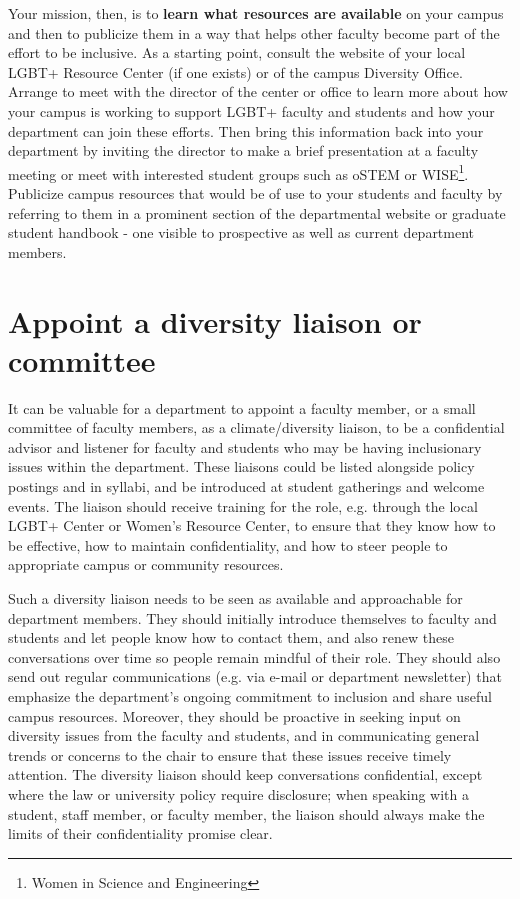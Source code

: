 Your mission, then, is to \textbf{learn what resources are available} on your campus and then to publicize them in a way that helps other faculty become part of the effort to be inclusive. As a starting point, consult the website of your local LGBT+ Resource Center (if one exists) or of the campus Diversity Office. Arrange to meet with the director of the center or office to learn more about how your campus is working to support LGBT+ faculty and students and how your department can join these efforts. Then bring this information back into your department by inviting the director to make a brief presentation at a faculty meeting or meet with interested student groups such as oSTEM or WISE\footnote{ Women in Science and Engineering}. Publicize campus resources that would be of use to your students and faculty by referring to them in a prominent section of the departmental website or graduate student handbook - one visible to prospective as well as current department members.


\section {Appoint a diversity liaison or committee}
\label{liaison}
It can be valuable for a department to appoint a faculty member, or a small committee of faculty members, as a climate/diversity liaison, to be a confidential advisor and listener for faculty and students who may be having inclusionary issues within the department. These liaisons could be listed alongside policy postings and in syllabi, and be introduced at student gatherings and welcome events. The liaison should receive training for the role, e.g. through the local LGBT+ Center or Women's Resource Center, to ensure that they know how to be effective, how to maintain confidentiality, and how to steer people to appropriate campus or community resources. 

Such a diversity liaison needs to be seen as available and approachable for department members. They should initially introduce themselves to faculty and students and let people know how to contact them, and also renew these conversations over time so people remain mindful of their role. They should also send out regular communications (e.g. via e-mail or department newsletter) that emphasize the department's ongoing commitment to inclusion and share useful campus resources. Moreover, they should be proactive in seeking input on diversity issues from the faculty and students, and in communicating general trends or concerns to the chair to ensure that these issues receive timely attention. The diversity liaison should keep conversations confidential, except where the law or university policy require disclosure; when speaking with a student, staff member, or faculty member, the liaison should always make the limits of their confidentiality promise clear.


